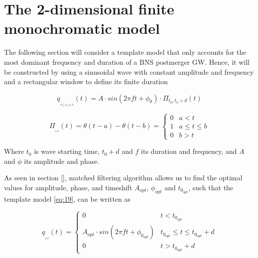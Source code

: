 \FloatBarrier


\section{The 2-dimensional finite monochromatic model}\label{2dsearch}

The following section will consider a template model that only accounts for the most dominant frequency and duration of a BNS postmerger GW. Hence, it will be constructed by using a sinusoidal wave with constant amplitude and frequency and a rectangular window to define its finite duration 


\begin{equation}\label{eq:19}
q_{_{_{A, f, \phi_0, t_{0}, d}}}(t) =A \cdot sin(2\pi f t + \phi_0) \cdot \Pi_{t_{0},t_{0} + d}(t)
\end{equation}


\begin{equation}\label{eq:18}
\Pi_{_{_{a,b}}}(t) = \theta(t-a)-\theta(t-b) = 
\begin{cases} 
      0 & a<t \\
      1 & a \leq t\leq b \\
      0 & b>t
   \end{cases}
\end{equation}

Where $t_0$ is wave starting time, $t_0+d$ and $f$ its duration and frequency, and $A$ and $\phi$ its amplitude and phase.


As seen in section \ref{}, matched filtering algorithm allows us to find the optimal values for amplitude, phase, and timeshift $A_{opt}$, $\phi_{opt}$ and $t_{0_{opt}}$, such that the template model \ref{eq:19}, can be written as

\begin{equation}\label{eq:20}
q_{_{_{f,d}}}(t) =
\begin{cases} 
      0 & t<t_{0_{opt}} \\
      A_{opt} \cdot sin(2\pi f t + \phi_{0_{opt}}) & t_{0_{opt}} \leq t\leq t_{0_{opt}}+d \\
      0 & t>t_{0_{opt}}+d
   \end{cases}
\end{equation}

